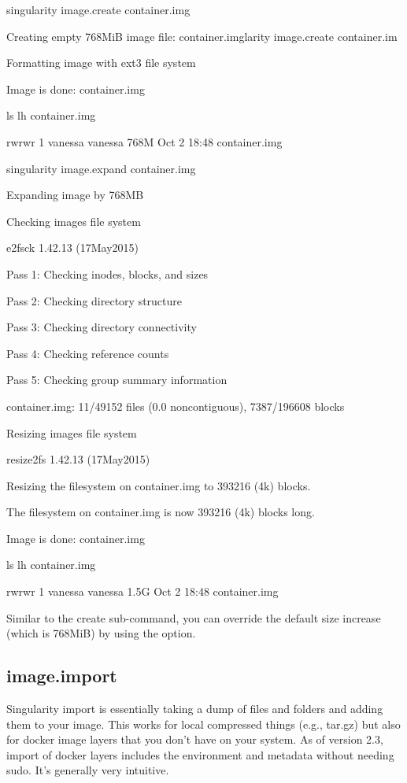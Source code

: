 \documentclass[letterpaper,10pt,english]{sphinxmanual}
\begin{document}
%
\begin{sphinxVerbatim}[commandchars=\\\{\}]
\PYGZdl{} singularity image.create container.img

Creating empty 768MiB image file: container.imglarity image.create container.im

Formatting image with ext3 file system

Image is done: container.img


\PYGZdl{} ls \PYGZhy{}lh container.img

\PYGZhy{}rw\PYGZhy{}rw\PYGZhy{}r\PYGZhy{}\PYGZhy{} 1 vanessa vanessa 768M Oct  2 18:48 container.img


\PYGZdl{} singularity image.expand container.img

Expanding image by 768MB

Checking image\PYGZsq{}s file system

e2fsck 1.42.13 (17\PYGZhy{}May\PYGZhy{}2015)

Pass 1: Checking inodes, blocks, and sizes

Pass 2: Checking directory structure

Pass 3: Checking directory connectivity

Pass 4: Checking reference counts

Pass 5: Checking group summary information

container.img: 11/49152 files (0.0\PYGZpc{} non\PYGZhy{}contiguous), 7387/196608 blocks

Resizing image\PYGZsq{}s file system

resize2fs 1.42.13 (17\PYGZhy{}May\PYGZhy{}2015)

Resizing the filesystem on container.img to 393216 (4k) blocks.

The filesystem on container.img is now 393216 (4k) blocks long.

Image is done: container.img


\PYGZdl{} ls \PYGZhy{}lh container.img

\PYGZhy{}rw\PYGZhy{}rw\PYGZhy{}r\PYGZhy{}\PYGZhy{} 1 vanessa vanessa 1.5G Oct  2 18:48 container.img
\end{sphinxVerbatim}

Similar to the create sub-command, you can override the default size
increase (which is 768MiB) by using the  option.


\subsection{image.import}
\label{\detokenize{appendix:image-import}}\label{\detokenize{appendix:id40}}\label{\detokenize{appendix:sec-imageimport}}
Singularity import is essentially taking a dump of files and folders
and adding them to your image. This works for local compressed things
(e.g., tar.gz) but also for docker image layers that you don’t have on
your system. As of version 2.3, import of docker layers includes the
environment and metadata without needing sudo. It’s generally very
intuitive.
\end{document}

